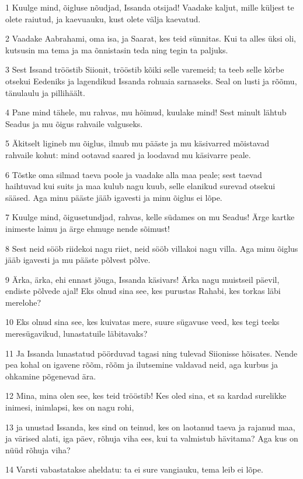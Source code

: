 \par 1 Kuulge mind, õigluse nõudjad, Issanda otsijad! Vaadake kaljut, mille küljest te olete raiutud, ja kaevuauku, kust olete välja kaevatud.
\par 2 Vaadake Aabrahami, oma isa, ja Saarat, kes teid sünnitas. Kui ta alles üksi oli, kutsusin ma tema ja ma õnnistasin teda ning tegin ta paljuks.
\par 3 Sest Issand trööstib Siionit, trööstib kõiki selle varemeid; ta teeb selle kõrbe otsekui Eedeniks ja lagendikud Issanda rohuaia sarnaseks. Seal on lusti ja rõõmu, tänulaulu ja pillihäält.
\par 4 Pane mind tähele, mu rahvas, mu hõimud, kuulake mind! Sest minult lähtub Seadus ja mu õigus rahvaile valguseks.
\par 5 Äkitselt ligineb mu õiglus, ilmub mu pääste ja mu käsivarred mõistavad rahvaile kohut: mind ootavad saared ja loodavad mu käsivarre peale.
\par 6 Tõstke oma silmad taeva poole ja vaadake alla maa peale; sest taevad haihtuvad kui suits ja maa kulub nagu kuub, selle elanikud surevad otsekui sääsed. Aga minu pääste jääb igavesti ja minu õiglus ei lõpe.
\par 7 Kuulge mind, õigusetundjad, rahvas, kelle südames on mu Seadus! Ärge kartke inimeste laimu ja ärge ehmuge nende sõimust!
\par 8 Sest neid sööb riidekoi nagu riiet, neid sööb villakoi nagu villa. Aga minu õiglus jääb igavesti ja mu pääste põlvest põlve.
\par 9 Ärka, ärka, ehi ennast jõuga, Issanda käsivars! Ärka nagu muistseil päevil, endiste põlvede ajal! Eks olnud sina see, kes purustas Rahabi, kes torkas läbi merelohe?
\par 10 Eks olnud sina see, kes kuivatas mere, suure sügavuse veed, kes tegi teeks meresügavikud, lunastatuile läbitavaks?
\par 11 Ja Issanda lunastatud pöörduvad tagasi ning tulevad Siionisse hõisates. Nende pea kohal on igavene rõõm, rõõm ja ilutsemine valdavad neid, aga kurbus ja ohkamine põgenevad ära.
\par 12 Mina, mina olen see, kes teid trööstib! Kes oled sina, et sa kardad surelikke inimesi, inimlapsi, kes on nagu rohi,
\par 13 ja unustad Issanda, kes sind on teinud, kes on laotanud taeva ja rajanud maa, ja värised alati, iga päev, rõhuja viha ees, kui ta valmistub hävitama? Aga kus on nüüd rõhuja viha?
\par 14 Varsti vabastatakse aheldatu: ta ei sure vangiauku, tema leib ei lõpe.
